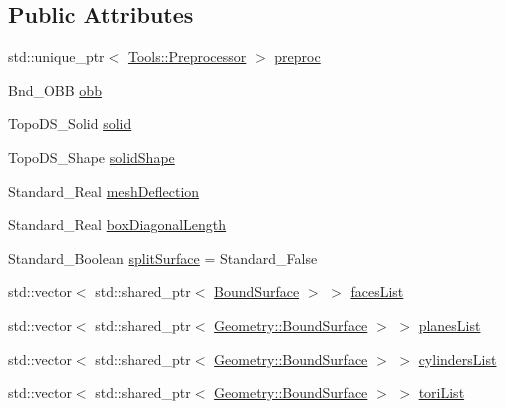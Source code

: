 \subsection*{Public Attributes}
\begin{DoxyCompactItemize}
\item 
std\+::unique\+\_\+ptr$<$ \hyperlink{classMcCAD_1_1Tools_1_1Preprocessor}{Tools\+::\+Preprocessor} $>$ \hyperlink{classMcCAD_1_1Geometry_1_1Solid_1_1Impl_ab6393d9ccf9e8046915b6f2b1facfb03}{preproc}
\item 
Bnd\+\_\+\+O\+BB \hyperlink{classMcCAD_1_1Geometry_1_1Solid_1_1Impl_abb00ec0b4230c6e484b751812bcc9050}{obb}
\item 
Topo\+D\+S\+\_\+\+Solid \hyperlink{classMcCAD_1_1Geometry_1_1Solid_1_1Impl_a279f71c11f2a7b285e3093879baf9362}{solid}
\item 
Topo\+D\+S\+\_\+\+Shape \hyperlink{classMcCAD_1_1Geometry_1_1Solid_1_1Impl_afcbcbf0a3fa169631d546d96e430f91f}{solid\+Shape}
\item 
Standard\+\_\+\+Real \hyperlink{classMcCAD_1_1Geometry_1_1Solid_1_1Impl_af8a04ab67e6fa83736a4ae9ebcfcc877}{mesh\+Deflection}
\item 
Standard\+\_\+\+Real \hyperlink{classMcCAD_1_1Geometry_1_1Solid_1_1Impl_a797ace8ee10123eab4bd27ef4385cbd3}{box\+Diagonal\+Length}
\item 
Standard\+\_\+\+Boolean \hyperlink{classMcCAD_1_1Geometry_1_1Solid_1_1Impl_a541bb95b820e30d0086d1ee1026acfcd}{split\+Surface} = Standard\+\_\+\+False
\item 
std\+::vector$<$ std\+::shared\+\_\+ptr$<$ \hyperlink{classMcCAD_1_1Geometry_1_1BoundSurface}{Bound\+Surface} $>$ $>$ \hyperlink{classMcCAD_1_1Geometry_1_1Solid_1_1Impl_a7127bb4d730197014b421e43ac19edfa}{faces\+List}
\item 
std\+::vector$<$ std\+::shared\+\_\+ptr$<$ \hyperlink{classMcCAD_1_1Geometry_1_1BoundSurface}{Geometry\+::\+Bound\+Surface} $>$ $>$ \hyperlink{classMcCAD_1_1Geometry_1_1Solid_1_1Impl_a5b4fb46f10895ab3f6fe12243f317ef6}{planes\+List}
\item 
std\+::vector$<$ std\+::shared\+\_\+ptr$<$ \hyperlink{classMcCAD_1_1Geometry_1_1BoundSurface}{Geometry\+::\+Bound\+Surface} $>$ $>$ \hyperlink{classMcCAD_1_1Geometry_1_1Solid_1_1Impl_ac1b821a1379d379eea144aabe2c34e89}{cylinders\+List}
\item 
std\+::vector$<$ std\+::shared\+\_\+ptr$<$ \hyperlink{classMcCAD_1_1Geometry_1_1BoundSurface}{Geometry\+::\+Bound\+Surface} $>$ $>$ \hyperlink{classMcCAD_1_1Geometry_1_1Solid_1_1Impl_a32250ff3ecc553321430d595d92989c0}{tori\+List}

\end{DoxyCompactItemize}
